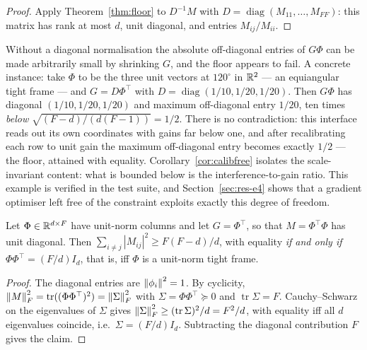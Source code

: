 \begin{proof}
Apply Theorem~\ref{thm:floor} to $D^{-1}M$ with $D=\operatorname{diag}(M_{11},\dots,M_{FF})$:
this matrix has rank at most $d$, unit diagonal, and entries $M_{ij}/M_{ii}$.
\end{proof}

\begin{remark}
\label{rem:calib}
Without a diagonal normalisation the absolute off-diagonal entries of $G\Phi$ can be made
arbitrarily small by shrinking $G$, and the floor appears to fail. A concrete instance: take
$\Phi$ to be the three unit vectors at $120^{\circ}$ in $\mathbb{R}^2$ --- an equiangular tight frame
--- and $G=D\Phi^{\top}$ with $D=\operatorname{diag}(1/10,1/20,1/20)$. Then $G\Phi$ has
diagonal $(1/10,1/20,1/20)$ and maximum off-diagonal entry $1/20$, ten times \emph{below}
$\sqrt{(F-d)/(d(F-1))}=1/2$. There is no contradiction: this interface reads out its own
coordinates with gains far below one, and after recalibrating each row to unit gain the
maximum off-diagonal entry becomes exactly $1/2$ --- the floor, attained with equality.
Corollary~\ref{cor:calibfree} isolates the scale-invariant content: what is bounded below is
the interference-to-gain ratio. This example is verified in the test suite, and
Section~\ref{sec:res-e4} shows that a gradient optimiser left free of the constraint exploits
exactly this degree of freedom.
\end{remark}

\begin{proposition}
\label{prop:tight}
Let $\Phi\in\mathbb{R}^{d\times F}$ have unit-norm columns and let $G=\Phi^{\top}$, so that
$M=\Phi^{\top}\Phi$ has unit diagonal. Then $\sum_{i\neq j}|M_{ij}|^2\ge F(F-d)/d$, with
equality \emph{if and only if} $\Phi\Phi^{\top}=(F/d)I_d$, that is, iff $\Phi$ is a unit-norm
tight frame.
\end{proposition}

\begin{proof}
The diagonal entries are $\left\lVert \phi_i \right\rVert^2=1$. By cyclicity,
$\left\lVert M \right\rVert_F^2=\operatorname{tr}((\Phi\Phi^{\top})^2)=\left\lVert \Sigma \right\rVert_F^2$ with
$\Sigma=\Phi\Phi^{\top}\succeq0$ and $\operatorname{tr}\Sigma=F$. Cauchy--Schwarz on the
eigenvalues of $\Sigma$ gives $\left\lVert \Sigma \right\rVert_F^2\ge(\operatorname{tr}\Sigma)^2/d=F^2/d$, with
equality iff all $d$ eigenvalues coincide, i.e.\ $\Sigma=(F/d)I_d$. Subtracting the diagonal
contribution $F$ gives the claim.
\end{proof}

